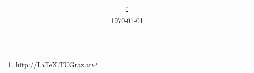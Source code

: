 

\title{%
\mytitle\\%
\mysubject}

\author{\myauthor
  \thanks{\href{http://LaTeX.TUGraz.at}{http://LaTeX.TUGraz.at}}\\
    \date{\today}
}

\maketitle




